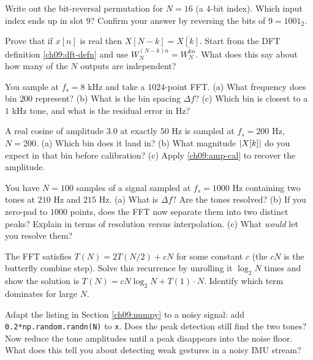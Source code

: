 \begin{exercise}
\label{ch09:ex-bitrev}
Write out the bit-reversal permutation for $N = 16$ (a $4$-bit index). Which input index
ends up in slot $9$? Confirm your answer by reversing the bits of $9 = 1001_2$.
\end{exercise}

\begin{exercise}
\label{ch09:ex-symmetry}
Prove that if $x[n]$ is real then $X[N-k] = \overline{X[k]}$. Start from the DFT
definition \eqref{ch09:dft-defn} and use $W_N^{(N-k)n} = \overline{W_N^{kn}}$. What does
this say about how many of the $N$ outputs are independent?
\end{exercise}

\begin{exercise}
\label{ch09:ex-binfreq}
You sample at $f_s = 8$ kHz and take a $1024$-point FFT. (a) What frequency does bin $200$
represent? (b) What is the bin spacing $\Delta f$? (c) Which bin is closest to a $1$ kHz
tone, and what is the residual error in Hz?
\end{exercise}

\begin{exercise}
\label{ch09:ex-amp}
A real cosine of amplitude $3.0$ at exactly $50$ Hz is sampled at $f_s = 200$ Hz, $N =
200$. (a) Which bin does it land in? (b) What magnitude $\lvert X[k]\rvert$ do you expect in that
bin before calibration? (c) Apply \eqref{ch09:amp-cal} to recover the amplitude.
\end{exercise}

\begin{exercise}
\label{ch09:ex-zeropad}
You have $N = 100$ samples of a signal sampled at $f_s = 1000$ Hz containing two tones at
$210$ Hz and $215$ Hz. (a) What is $\Delta f$? Are the tones resolved? (b) If you
zero-pad to $1000$ points, does the FFT now separate them into two distinct peaks?
Explain in terms of resolution versus interpolation. (c) What \emph{would} let you
resolve them?
\end{exercise}

\begin{exercise}
\label{ch09:ex-recurrence}
The FFT satisfies $T(N) = 2T(N/2) + cN$ for some constant $c$ (the $cN$ is the butterfly
combine step). Solve this recurrence by unrolling it $\log_2 N$ times and show the
solution is $T(N) = cN\log_2 N + T(1)\cdot N$. Identify which term dominates for large
$N$.
\end{exercise}

\begin{exercise}
\label{ch09:ex-numpy}
Adapt the listing in Section \ref{ch09:numpy} to a noisy signal: add
\texttt{0.2*np.random.randn(N)} to \texttt{x}. Does the peak detection still find the two
tones? Now reduce the tone amplitudes until a peak disappears into the noise floor. What
does this tell you about detecting weak gestures in a noisy IMU stream?
\end{exercise}

